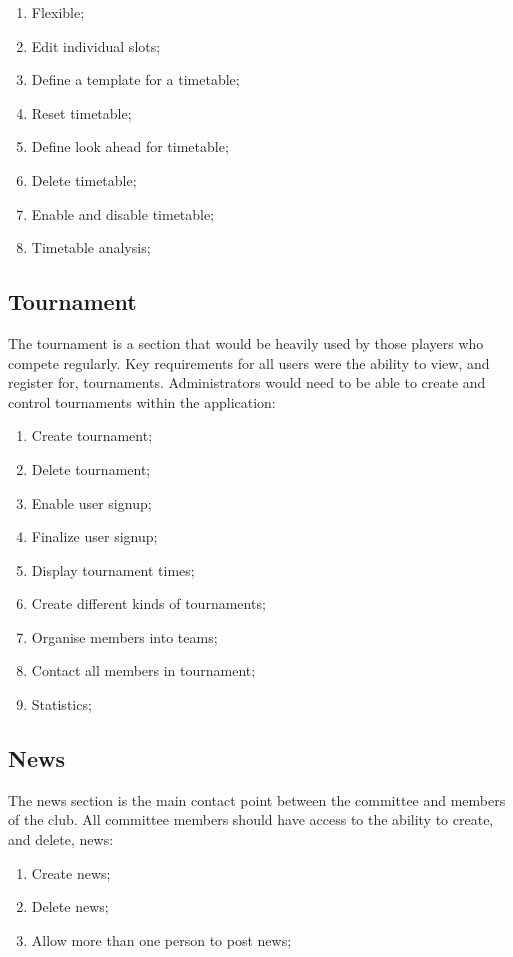 \begin{enumerate}
\item Flexible;
\item Edit individual slots;
\item Define a template for a timetable;
\item Reset timetable;
\item Define look ahead for timetable;
\item Delete timetable;
\item Enable and disable timetable;
\item Timetable analysis;
\end{enumerate}

\subsection{Tournament}

The tournament is a section that would be heavily used by those players who compete regularly. Key requirements for all users were the ability to view, and register for, tournaments. Administrators would need to be able to create and control tournaments within the application:

\begin{enumerate}
\item Create tournament;
\item Delete tournament;
\item Enable user signup;
\item Finalize user signup;
\item Display tournament times;
\item Create different kinds of tournaments;
\item Organise members into teams;
\item Contact all members in tournament;
\item Statistics;
\end{enumerate}


\subsection{News}

The news section is the main contact point between the committee and members of the club. All committee members should have access to the ability to create, and delete, news:

\begin{enumerate}
\item Create news;
\item Delete news;
\item Allow more than one person to post news;
\end{enumerate}

